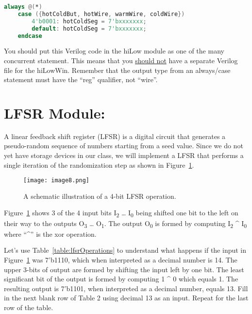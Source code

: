 \begin{lstlisting}[language=Verilog,
 caption={Starter code for the hiLowWin module.},
 label={listing:hiLowWinVerilog},
 frame=single]
 always @(*)
	case ({hotColdBut, hotWire, warmWire, coldWire})            
		4'b0001: hotColdSeg = 7'bxxxxxxx;				
		default: hotColdSeg = 7'bxxxxxxx;
	endcase  
 \end{lstlisting}

You should put this Verilog code in the hiLow module as one of the many
concurrent statement. This means that you \uline{should not} have a
separate Verilog file for the hiLowWin. Remember that the output type
from an always/case statement must have the ``reg'' qualifier, not
``wire''.

\hypertarget{lfsr-module}{%
\section{LFSR Module:}\label{lfsr-module}}

A linear feedback shift register (LFSR) is a digital circuit that
generates a pseudo-random sequence of numbers starting from a seed
value. Since we do not yet have storage devices in our class, we will
implement a LFSR that performs a single iteration of the randomization
step as shown in Figure~\ref{fig:lfsrOperation}.

\begin{figure}[ht]
\texttt{[image: image8.png]}
\caption{A schematic illustration of a 4-bit LFSR operation.}
\label{fig:lfsrOperation}
\end{figure}

Figure~\ref{fig:lfsrOperation} shows 3 of the 4 input bits I\textsubscript{2} \ldots{}
I\textsubscript{0} being shifted one bit to the left on their way to the
outputs O\textsubscript{3} \ldots{} O\textsubscript{1}. The output
O\textsubscript{0} is formed by computing I\textsubscript{2} \^{}
I\textsubscript{0} where ``\^{}'' is the xor operation.

Let's use Table~\ref{table:lfsrOperations} to 
understand what happens if the input in 
Figure~\ref{fig:lfsrOperation}
was 7'b1110, which when interpreted as a decimal number is 14. The upper
3-bits of output are formed by shifting the input left by one bit. The
least significant bit of the output is formed by computing 1 \^{} 0
which equals 1. The resulting output is 7'b1101, when interpreted as a
decimal number, equals 13. Fill in the next blank row of Table 2 using
decimal 13 as an input. Repeat for the last row of the table.

